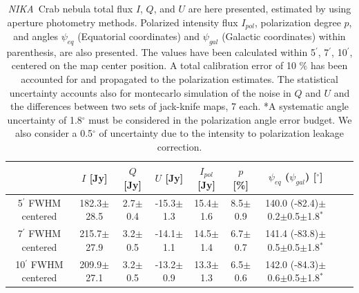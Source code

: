 \documentclass[twocolumn,traditabstract]{aa}
\def\NIKA{\textit{NIKA}}
\begin{document}
\begin{table}[h!]
  \centering
      \begin{tabular}{ccccccccc}
      \hline
      \hline
       & \small $I$ [Jy] & \small $Q$ [Jy] & \small $U$ [Jy] & \small $I_{pol}$ [Jy] & \small $p$ [\%] & \small $\psi_{eq}$ ($\psi_{gal}$) [$^\circ$] \\
      \hline

\small 5$^{\prime}$ FWHM centered & \small 182.3$\pm$28.5 & \small 2.7$\pm$0.4 & \small -15.3$\pm$1.3 & \small 15.4$\pm$1.6 & \small 8.5$\pm$0.9 & \small 140.0 (-82.4)$\pm$0.2$\pm$0.5$\pm$1.8$^*$  \\ 
\small 7$^{\prime}$ FWHM centered & \small 215.7$\pm$27.9 & \small 3.2$\pm$0.5 & \small -14.1$\pm$1.1 & \small 14.5$\pm$1.4 & \small 6.7$\pm$0.7 & \small 141.4 (-83.8)$\pm$0.5$\pm$0.5$\pm$1.8$^*$ \\ 
\small 10$^{\prime}$ FWHM centered & \small 209.9$\pm$27.1 & \small 3.2$\pm$0.5 & \small -13.2$\pm$0.9 & \small 13.3$\pm$1.3 & \small 6.5$\pm$0.6 & \small 142.0 (-84.3)$\pm$0.6$\pm$0.5$\pm$1.8$^*$ \\ 
\hline            
    \hline   
    \end{tabular}
   \caption{ 
   \NIKA\ Crab nebula total flux $I$, $Q$, and $U$ are here presented, estimated by using aperture photometry methods. Polarized intensity flux $I_{pol}$, polarization degree $p$, and angles $\psi_{eq}$ (Equatorial coordinates) and $\psi_{gal}$ (Galactic coordinates) within parenthesis, are also presented. The values have been calculated within 5$^{\prime}$, 7$^{\prime}$, 10$^{\prime}$, centered on the map center position.
   A total calibration error of 10 $\%$ has been accounted for and propagated to the polarization estimates. The statistical uncertainty accounts also for montecarlo simulation of the noise in $Q$ and $U$ and the differences between two sets of jack-knife maps, 7 each.
 *A systematic angle uncertainty of 1.8$^{\circ}$ must be considered in the polarization angle error budget. We also consider a 0.5$^{\circ}$ of uncertainty due to the intensity to polarization leakage correction.    
    }
    \label{tab:crab_results}
 \end{table}
\end{document}
